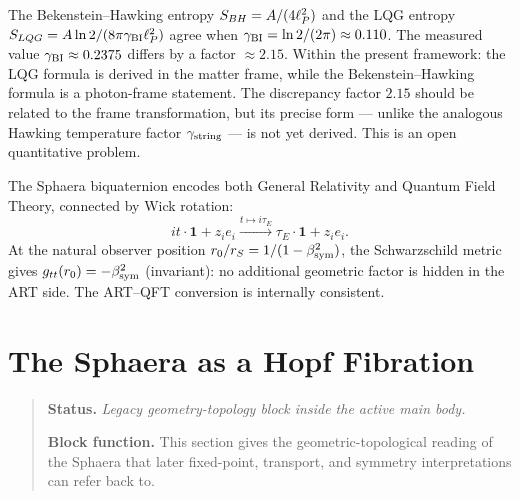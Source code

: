 \begin{remark}
The Bekenstein--Hawking entropy $S_{BH}=A/(4\ell_P^2)$ and the LQG entropy
$S_{LQG}=A\ln 2/(8\pi\gamma_{\mathrm{BI}}\ell_P^2)$ agree when $\gamma_{\mathrm{BI}}=\ln 2/(2\pi)\approx 0.110$.
The measured value $\gamma_{\mathrm{BI}}\approx 0.2375$ differs by a factor $\approx 2.15$.
Within the present framework: the LQG formula is derived in the matter
frame, while the Bekenstein--Hawking formula is a photon-frame statement.
The discrepancy factor $2.15$ should be related to the frame
transformation, but its precise form --- unlike the analogous Hawking
temperature factor $\gamma_{\mathrm{string}}$ --- is not yet derived.
This is an open quantitative problem.
\end{remark}

\begin{theorem}\label{thm:artqft}
The Sphaera biquaternion encodes both General Relativity and Quantum
Field Theory, connected by Wick rotation:
\[
 it\cdot\mathbf{1} + z_i e_i
 \xrightarrow{t\mapsto i\tau_E}
 \tau_E\cdot\mathbf{1} + z_i e_i.
\]
At the natural observer position $r_0/r_S = 1/(1-\beta_{\mathrm{sym}}^2)$, the
Schwarzschild metric gives $g_{tt}(r_0)=-\beta_{\mathrm{sym}}^2$ (invariant): no
additional geometric factor is hidden in the ART side.
The ART--QFT conversion is internally consistent.
\end{theorem}


\section{The Sphaera as a Hopf Fibration}
\begin{quote}\small
\noindent\textbf{Status.} \emph{Legacy geometry-topology block inside the active main body.}\par
\noindent\textbf{Block function.} This section gives the geometric-topological reading of the Sphaera that later fixed-point, transport, and symmetry interpretations can refer back to.
\end{quote}
\label{sec:hopf}


